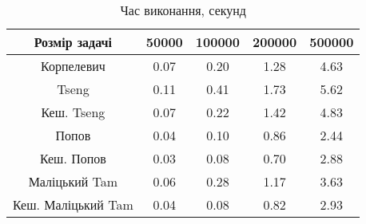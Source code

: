 \begin{table}[H]
	\centering
	\begin{tabular}{|c||c|c|c|c|}\hline
		Розмір задачі & 50000 & 100000 & 200000 & 500000 \\ \hline \hline
		Корпелевич & 0.07 & 0.20 & 1.28 & 4.63 \\ \hline
		Tseng & 0.11 & 0.41 & 1.73 & 5.62 \\ \hline
		Кеш. Tseng & 0.07 & 0.22 & 1.42 & 4.83 \\ \hline
		Попов & 0.04 & 0.10 & 0.86 & 2.44 \\ \hline
		Кеш. Попов & 0.03 & 0.08 & 0.70 & 2.88 \\ \hline
		Маліцький Tam & 0.06 & 0.28 & 1.17 & 3.63 \\ \hline
		Кеш. Маліцький Tam & 0.04 & 0.08 & 0.82 & 2.93 \\ \hline
	\end{tabular}
	\caption{Час виконання, секунд}
\end{table}
